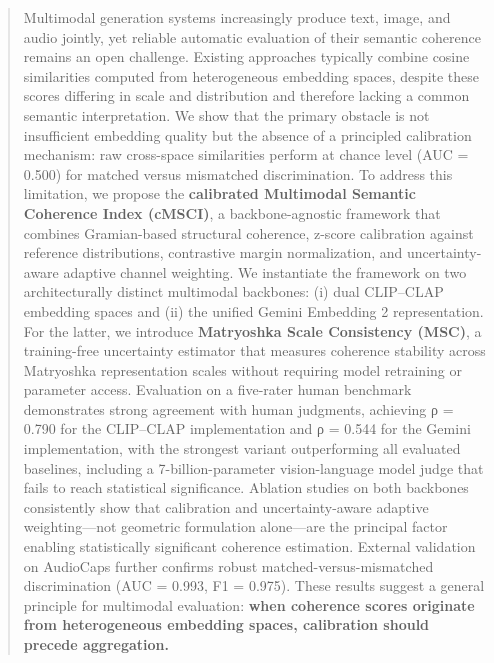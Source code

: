 \documentclass[a4paper,fleqn]{cas-sc}
\begin{document}
\begin{abstract}
Multimodal generation systems increasingly produce text, image, and audio jointly, yet reliable automatic evaluation of their semantic coherence remains an open challenge. Existing approaches typically combine cosine similarities computed from heterogeneous embedding spaces, despite these scores differing in scale and distribution and therefore lacking a common semantic interpretation. We show that the primary obstacle is not insufficient embedding quality but the absence of a principled calibration mechanism: raw cross-space similarities perform at chance level (AUC = 0.500) for matched versus mismatched discrimination. To address this limitation, we propose the \textbf{calibrated Multimodal Semantic Coherence Index (cMSCI)}, a backbone-agnostic framework that combines Gramian-based structural coherence, z-score calibration against reference distributions, contrastive margin normalization, and uncertainty-aware adaptive channel weighting. We instantiate the framework on two architecturally distinct multimodal backbones: (i) dual CLIP–CLAP embedding spaces and (ii) the unified Gemini Embedding 2 representation. For the latter, we introduce \textbf{Matryoshka Scale Consistency (MSC)}, a training-free uncertainty estimator that measures coherence stability across Matryoshka representation scales without requiring model retraining or parameter access. Evaluation on a five-rater human benchmark demonstrates strong agreement with human judgments, achieving ρ = 0.790 for the CLIP–CLAP implementation and ρ = 0.544 for the Gemini implementation, with the strongest variant outperforming all evaluated baselines, including a 7-billion-parameter vision-language model judge that fails to reach statistical significance. Ablation studies on both backbones consistently show that calibration and uncertainty-aware adaptive weighting—not geometric formulation alone—are the principal factor enabling statistically significant coherence estimation. External validation on AudioCaps further confirms robust matched-versus-mismatched discrimination (AUC = 0.993, F1 = 0.975). These results suggest a general principle for multimodal evaluation: \textbf{when coherence scores originate from heterogeneous embedding spaces, calibration should precede aggregation.}
\end{abstract}

\end{document}
